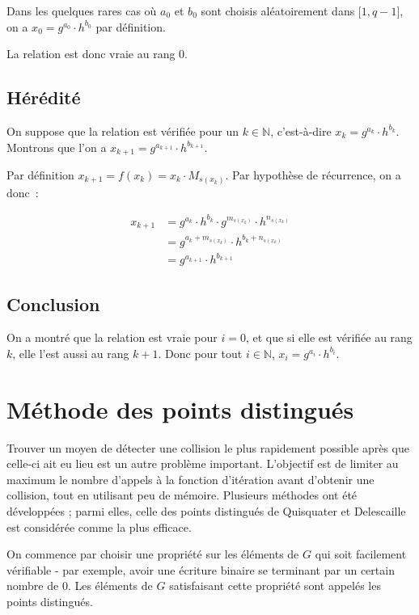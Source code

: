         Dans les quelques rares cas où $a_0$ et $b_0$ sont choisis aléatoirement dans $\mathopen{[}1,q-1\mathclose{]}$, on a $x_0 = g^{a_0} \cdot h^{b_0}$ par définition.

        La relation est donc vraie au rang $0$.

        \subsection*{Hérédité}
        On suppose que la relation est vérifiée pour un $k \in \mathbb{N}$, c'est-à-dire $x_k = g^{a_k} \cdot h^{b_k}$. Montrons que l'on a $x_{k+1} = g^{a_{k+1}} \cdot h^{b_{k+1}}$.

        Par définition $x_{k+1} = f(x_k) = x_k \cdot M_{s(x_k)}$. Par hypothèse de récurrence, on a donc~:

       \begin{align*}
          x_{k+1} &= g^{a_k} \cdot h^{b_k} \cdot g^{m_{s(x_k)}} \cdot h^{n_{s(x_k)}} \\
                  &= g^{a_k + m_{s(x_k)}} \cdot h^{b_k + n_{s(x_k)}} \\
                  &=g^{a_{k+1}} \cdot h^{b_{k+1}}
        \end{align*}

        \subsection*{Conclusion}
        On a montré que la relation est vraie pour $i = 0$, et que si elle est vérifiée au rang $k$, elle l'est aussi au rang $k + 1$. Donc pour tout $i \in \mathbb{N}$, $x_i = g^{a_i} \cdot h^{b_i}$.

        \section{Méthode des points distingués}
        Trouver un moyen de détecter une collision le plus rapidement possible après que celle-ci ait eu lieu est un autre problème important. L'objectif est de limiter au maximum le nombre d'appels à la fonction d'itération avant d'obtenir une collision, tout en utilisant peu de mémoire. Plusieurs méthodes ont été développées ; parmi elles, celle des points distingués de Quisquater et Delescaille est considérée comme la plus efficace.

        On commence par choisir une propriété sur les éléments de $G$ qui soit facilement vérifiable - par exemple, avoir une écriture binaire se terminant par un certain nombre de $0$. Les éléments de $G$ satisfaisant cette propriété sont appelés les points distingués.

